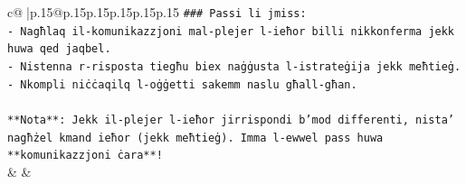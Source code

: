 \documentclass{article}
\begin{document}
{\begin{supertabular}{c@{$\;$}|p{.15\linewidth}@{}p{.15\linewidth}p{.15\linewidth}p{.15\linewidth}p{.15\linewidth}p{.15\linewidth}}
{{{\texttt{\#\#\# Passi li jmiss:} \\
\texttt{{-} Nagħlaq il{-}komunikazzjoni mal{-}plejer l{-}ieħor billi nikkonferma jekk huwa qed jaqbel.} \\
\texttt{{-} Nistenna r{-}risposta tiegħu biex naġġusta l{-}istrateġija jekk meħtieġ.} \\
\texttt{{-} Nkompli niċċaqilq l{-}oġġetti sakemm naslu għall{-}għan.} \\
\\ 
\texttt{**Nota**: Jekk il{-}plejer l{-}ieħor jirrispondi b'mod differenti, nista' nagħżel kmand ieħor (jekk meħtieġ). Imma l{-}ewwel pass huwa **komunikazzjoni ċara**!} \\
            }
        }
    }
    & & \\ \\


\end{supertabular}}
\end{document}
